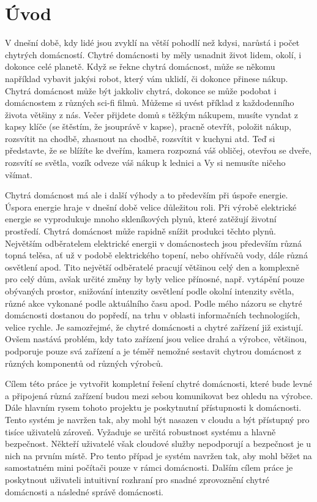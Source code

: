 \chapter{Úvod}

V dnešní době, kdy lidé jsou zvyklí na větší pohodlí než kdysi, narůstá i počet chytrých domácností.
Chytré domácnosti by měly usnadnit život lidem, okolí, i dokonce celé planetě.
Když se řekne chytrá domácnost, může se někomu například vybavit jakýsi robot, který vám uklidí, či dokonce přinese nákup.
Chytrá domácnost může být jakkoliv chytrá, dokonce se může podobat i domácnostem z různých sci-fi filmů.
Můžeme si uvést příklad z každodenního života většiny z nás.
Večer přijdete domů s těžkým nákupem, musíte vyndat z kapsy klíče (se štěstím, že jsouprávě v kapse), pracně otevřít, položit nákup, rozsvítit na chodbě, zhasnout na chodbě,
rozsvítit v kuchyni atd.
Teď si představte, že se blížíte ke dveřím, kamera rozpozná váš obličej, otevřou se dveře, rozsvítí se světla, vozík odveze váš nákup k lednici a Vy si nemusíte ničeho všímat.

Chytrá domácnost má ale i další výhody a to především při úspoře energie.
Úspora energie hraje v dnešní době velice důležitou roli.
Při výrobě elektrické energie se vyprodukuje mnoho skleníkových plynů, které zatěžují životní prostředí.
Chytrá domácnost může rapidně snížit produkci těchto plynů.
Největším odběratelem elektrické energii v domácnostech jsou především různá topná telěsa, ať už v podobě elektrického topení, nebo ohřívačů vody, dále různá osvětlení apod.
Tito největší odběratelé pracují většinou celý den a komplexně pro celý dům, avšak určité změny by byly velice přínosné, např. vytápění pouze obývaných prostor,
snižování intenzity osvětlení podle okolní intenzity světla, různé akce vykonané podle aktuálního času apod.
Podle mého názoru se chytré domácnosti dostanou do popředí, na trhu v oblasti informačních technologiích, velice rychle.
Je samozřejmé, že chytré domácnosti a chytré zařízení již existují.
Ovšem nastává problém, kdy tato zařízení jsou velice drahá a výrobce, většinou, podporuje pouze svá zařízení a je téměř nemožné sestavit chytrou domácnost z různých komponentů od různých výrobců.

Cílem této práce je vytvořit kompletní řešení chytré domácnosti, které bude levné a připojená různá zařízení budou mezi sebou komunikovat bez ohledu na výrobce.
Dále hlavním rysem tohoto projektu je poskytnutní přístupnosti k domácnosti. Tento systém je navržen tak, aby mohl být nasazen v cloudu a být přístupný pro tisíce uživatelů zároveň. Vyžaduje se určitá robustnost systému a hlavně bezpečnost.
Někteří uživatelé však cloudové služby nepodporují a bezpečnost je u nich na prvním místě. Pro tento případ je systém navržen tak, aby mohl běžet na samostatném mini počítači pouze v rámci domácnosti. Dalším cílem práce je poskytnout uživateli
intuitivní rozhraní pro snadné zprovoznění chytré domácnosti a následné správě domácnosti.

